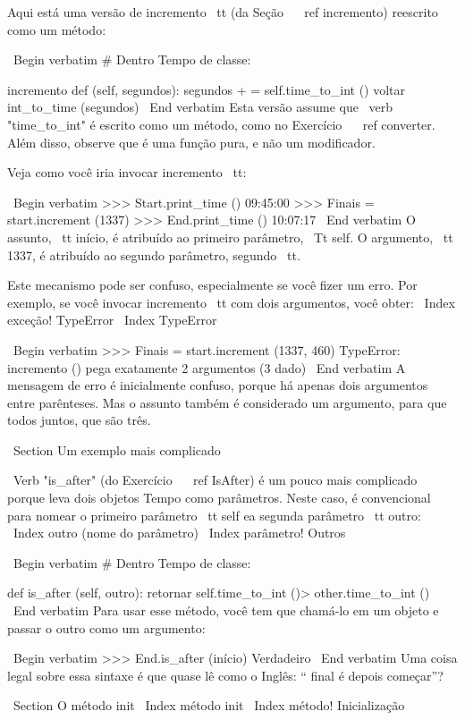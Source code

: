 \documentclass[10pt]{book}
\begin{document}
{{{{{{{{{{{{{{Aqui está uma versão de incremento {\ tt} (da Seção ~ \ ref {incremento})
reescrito como um método:

\ Begin {verbatim}
# Dentro Tempo de classe:

    incremento def (self, segundos):
        segundos + = self.time_to_int ()
        voltar int_to_time (segundos)
\ End {verbatim}
%
Esta versão assume que \ verb "time_to_int" é escrito
como um método, como no Exercício ~ \ ref {} converter. Além disso, observe que
é uma função pura, e não um modificador.

Veja como você iria invocar {incremento \ tt}:

\ Begin {verbatim}
>>> Start.print_time ()
09:45:00
>>> Finais = start.increment (1337)
>>> End.print_time ()
10:07:17
\ End {verbatim}
%
O assunto, {\ tt início}, é atribuído ao primeiro parâmetro,
{\ Tt self}. O argumento, {\ tt 1337}, é atribuído ao
segundo parâmetro, segundo {\ tt}.

Este mecanismo pode ser confuso, especialmente se você fizer um erro.
Por exemplo, se você invocar {incremento \ tt} com dois argumentos, você
obter:
\ Index {exceção! TypeError}
\ Index {} TypeError

\ Begin {verbatim}
>>> Finais = start.increment (1337, 460)
TypeError: incremento () pega exatamente 2 argumentos (3 dado)
\ End {verbatim}
%
A mensagem de erro é inicialmente confuso, porque há
apenas dois argumentos entre parênteses. Mas o assunto também é
considerado um argumento, para que todos juntos, que são três.


\ Section {Um exemplo mais complicado}

\ Verb "is_after" (do Exercício ~ \ ref {IsAfter}) é um pouco mais complicado
porque leva dois objetos Tempo como parâmetros. Neste caso, é
convencional para nomear o primeiro parâmetro {\ tt self} ea segunda
parâmetro {\ tt outro}:
\ Index {outro (nome do parâmetro)}
\ Index {parâmetro! Outros}

\ Begin {verbatim}
# Dentro Tempo de classe:

    def is_after (self, outro):
        retornar self.time_to_int ()> other.time_to_int ()
\ End {verbatim}
%
Para usar esse método, você tem que chamá-lo em um objeto e passar
o outro como um argumento:

\ Begin {verbatim}
>>> End.is_after (início)
Verdadeiro
\ End {verbatim}
%
Uma coisa legal sobre essa sintaxe é que quase lê
como o Inglês: `` final é depois começar''?


\ Section {O método init}
\ Index {método init}
\ Index {método! Inicialização}

}}}}}}}}}}}}}}
\end{document}
